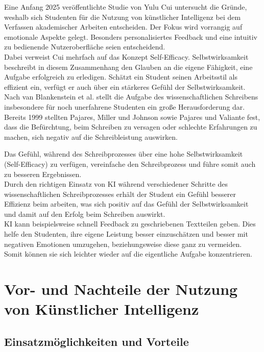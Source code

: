 \documentclass[../main.tex]{subfiles}
\begin{document}
Eine Anfang 2025 veröffentlichte Studie von Yulu Cui untersucht die Gründe, weshalb sich Studenten für die Nutzung von 
künstlicher Intelligenz bei dem Verfassen akademischer Arbeiten entscheiden. Der Fokus wird vorrangig auf emotionale 
Aspekte gelegt. Besonders personalisiertes Feedback und eine intuitiv zu bedienende Nutzeroberfläche seien entscheidend.\cite{influencingUsingAi} \\
Dabei verweist Cui mehrfach auf das Konzept Self-Efficacy. Selbstwirksamkeit beschreibt in diesem Zusammenhang den Glauben 
an die eigene Fähigkeit, eine Aufgabe erfolgreich zu erledigen. Schätzt ein Student seinen Arbeitsstil als effizient ein, 
verfügt er auch über ein stärkeres Gefühl der Selbstwirksamkeit.\cite{influencingUsingAi,SelfEfficacyBeliefs}\\
Nach van Blankenstein et al. stellt die Aufgabe des wissenschaftlichen Schreibens insbesondere für noch unerfahrene Studenten 
ein große Herausforderung dar. Bereits 1999 stellten Pajares, Miller und Johnson sowie Pajares und Valiante fest,
dass die Befürchtung, beim Schreiben zu versagen oder schlechte Erfahrungen zu machen, sich negativ auf die Schreibleistung 
auswirken.\cite{writingSelfBeliefs,writingSelfBeliefsMiddleSchool}

Das Gefühl, während des Schreibprozesses über eine hohe Selbstwirksamkeit (Self-Efficacy) zu verfügen, vereinfache den 
Schreibprozess und führe somit auch zu besseren Ergebnissen.\cite{SelfEfficacyBeliefs} \\
Durch den richtigen Einsatz von KI während verschiedener Schritte des wissenschaftlichen Schreibprozesses erhält der Student
ein Gefühl besserer Effizienz beim arbeiten, was sich positiv auf das Gefühl der Selbstwirksamkeit und damit auf den Erfolg
beim Schreiben auswirkt.\\
KI kann beispielsweise schnell Feedback zu geschriebenen Textteilen geben. Dies helfe den Studenten, ihre eigene 
Leistung besser einzuschätzen und besser mit negativen Emotionen umzugehen, beziehungsweise diese ganz zu vermeiden. Somit 
können sie sich leichter wieder auf die eigentliche Aufgabe konzentrieren.\cite{SelfEfficacyBeliefs} 



\section{Vor- und Nachteile der Nutzung von Künstlicher Intelligenz}

\subsection{Einsatzmöglichkeiten und Vorteile}
\end{document}
